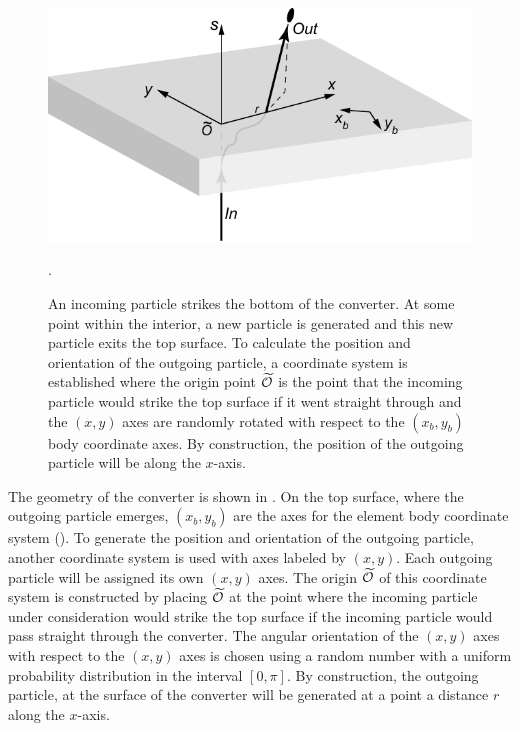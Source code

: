 
\begin{figure}[tb]
  \centering
  \includegraphics[width=5in]{converter.pdf}
  \caption[Converter geometry.]
  {
An incoming particle strikes the bottom of the converter. At some point within the interior, a new
particle is generated and this new particle exits the top surface. To calculate the position and
orientation of the outgoing particle, a coordinate system is established where the origin point
$\widetilde{{\cal O}}$ is the point that the incoming particle would strike the top surface if it went straight
through and the $(x,y)$ axes are randomly rotated with respect to the $(x_b,y_b)$ body coordinate axes.
By construction, the position of the outgoing particle will be along the $x$-axis.
  }
  \label{f:converter}.
\end{figure}


The geometry of the converter is shown in . On the top surface, where the outgoing
particle emerges, $(x_b,y_b)$ are the axes for the element body coordinate system ().
To generate the position and orientation of the outgoing particle, another coordinate system is used
with axes labeled by $(x,y)$. Each outgoing particle will be assigned its own $(x,y)$
axes. The origin $\widetilde{{\cal O}}$ of this coordinate system is constructed by placing $\widetilde{{\cal O}}$ at the
point where the incoming particle under consideration would strike the top surface if the incoming
particle would pass straight through the converter. The angular orientation of the $(x,y)$ axes
with respect to the $(x,y)$ axes is chosen using a random number with a uniform probability
distribution in the interval $[0, \pi]$. By construction, the outgoing particle, at the surface of
the converter will be generated at a point a distance $r$ along the $x$-axis.

